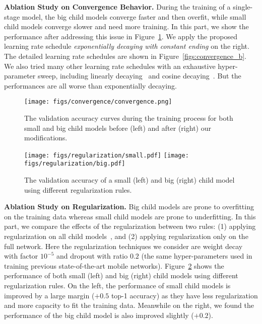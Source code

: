 \documentclass[runningheads]{llncs}
\begin{document}
\textbf{Ablation Study on Convergence Behavior.}
During the training of a single-stage model, the big child models converge faster and then overfit, while small child models converge slower and need more training. In this part, we show the performance after addressing this issue in Figure~\ref{figs:ablation_convergence}. We apply the proposed learning rate schedule \textit{exponentially decaying with constant ending} on the right. The detailed learning rate schedules are shown in Figure~\ref{figs:convergence_b}. We also tried many other learning rate schedules with an exhaustive hyper-parameter sweep, including linearly decaying~\cite{ma2018shufflenet, yu2019universally} and cosine decaying~\cite{loshchilov2016sgdr, he2019bag}. But the performances are all worse than exponentially decaying.

\begin{figure}[hb]
\centering
\texttt{[image: figs/convergence/convergence.png]}
\caption{The validation accuracy curves during the training process for both small and big child models before (left) and after (right) our modifications.}
\label{figs:ablation_convergence}
\end{figure}

\begin{figure}[ht]
\centering
\texttt{[image: figs/regularization/small.pdf]}
\texttt{[image: figs/regularization/big.pdf]}
\caption{The validation accuracy of a small (left) and big (right) child model using different regularization rules.}
\label{figs:regularization}
\end{figure}

\textbf{Ablation Study on Regularization.}
Big child models are prone to overfitting on the training data whereas small child models are prone to underfitting. In this part, we compare the effects of the regularization between two rules: (1) applying regularization on all child models~\cite{bender2018understanding}, and (2) applying regularization only on the full network. Here the regularization techniques we consider are weight decay with factor $10^{-5}$ and dropout with ratio \(0.2\) (the same hyper-parameters used in training previous state-of-the-art mobile networks). Figure~\ref{figs:regularization} shows the performance of both small (left) and big (right) child models using different regularization rules. On the left, the performance of small child models is improved by a large margin (\(+0.5\) top-1 accuracy) as they have less regularization and more capacity to fit the training data. Meanwhile on the right, we found the performance of the big child model is also improved slightly (\(+0.2\)).
\end{document}
